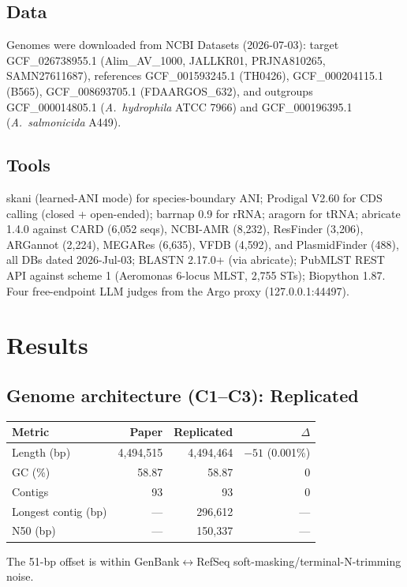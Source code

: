 \documentclass[11pt,letterpaper]{article}
\begin{document}
\subsection{Data}
Genomes were downloaded from NCBI Datasets (2026-07-03): target GCF\_026738955.1 (Alim\_AV\_1000, JALLKR01, PRJNA810265, SAMN27611687), references GCF\_001593245.1 (TH0426), GCF\_000204115.1 (B565), GCF\_008693705.1 (FDAARGOS\_632), and outgroups GCF\_000014805.1 (\textit{A.\ hydrophila} ATCC 7966) and GCF\_000196395.1 (\textit{A.\ salmonicida} A449).

\subsection{Tools}
skani (learned-ANI mode) for species-boundary ANI; Prodigal V2.60 for CDS calling (closed + open-ended); barrnap 0.9 for rRNA; aragorn for tRNA; abricate 1.4.0 against CARD (6{,}052 seqs), NCBI-AMR (8{,}232), ResFinder (3{,}206), ARGannot (2{,}224), MEGARes (6{,}635), VFDB (4{,}592), and PlasmidFinder (488), all DBs dated 2026-Jul-03; BLASTN 2.17.0+ (via abricate); PubMLST REST API against scheme 1 (Aeromonas 6-locus MLST, 2{,}755 STs); Biopython 1.87. Four free-endpoint LLM judges from the Argo proxy (127.0.0.1:44497).

\section{Results}

\subsection{Genome architecture (C1--C3): Replicated}
\begin{center}
\begin{tabular}{lrrr}
\toprule
Metric & Paper & Replicated & $\Delta$ \\
\midrule
Length (bp) & 4{,}494{,}515 & 4{,}494{,}464 & $-51$ (0.001\%) \\
GC (\%)     & 58.87        & 58.87        & 0 \\
Contigs     & 93           & 93           & 0 \\
Longest contig (bp) & --- & 296{,}612 & --- \\
N50 (bp)   & --- & 150{,}337 & --- \\
\bottomrule
\end{tabular}
\end{center}
The 51-bp offset is within GenBank$\leftrightarrow$RefSeq soft-masking/terminal-N-trimming noise.
\end{document}
